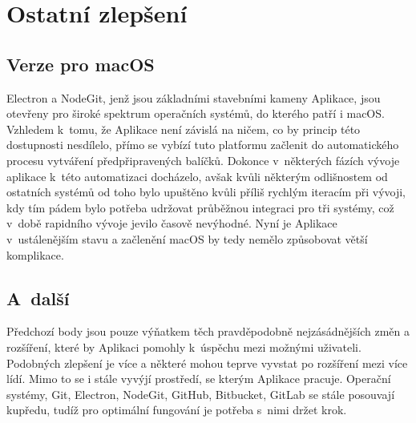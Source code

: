 \section{Ostatní zlepšení}

\subsection{Verze pro macOS}

Electron a NodeGit, jenž jsou základními stavebními kameny Aplikace, jsou otevřeny pro široké spektrum operačních systémů, do kterého patří i macOS. Vzhledem k~tomu, že Aplikace není závislá na ničem, co by princip této dostupnosti nesdílelo, přímo se vybízí tuto platformu začlenit do automatického procesu vytváření předpřipravených balíčků. Dokonce v~některých fázích vývoje aplikace k~této automatizaci docházelo, avšak kvůli některým odlišnostem od ostatních systémů od toho bylo upuštěno kvůli příliš rychlým iteracím při vývoji, kdy tím pádem bylo potřeba udržovat průběžnou integraci pro tři systémy, což v~době rapidního vývoje jevilo časově nevýhodné. Nyní je Aplikace v~ustálenějším stavu a začlenění macOS by tedy nemělo způsobovat větší komplikace.

\subsection{A~další}

Předchozí body jsou pouze výňatkem těch pravděpodobně nejzásádnějších změn a rozšíření, které by Aplikaci pomohly k~úspěchu mezi možnými uživateli. Podobných zlepšení je více a některé mohou teprve vyvstat po rozšíření mezi více lídí. Mimo to se i stále vyvýjí prostředí, se kterým Aplikace pracuje. Operační systémy, Git, Electron, NodeGit, GitHub, Bitbucket, GitLab se stále posouvají kupředu, tudíž pro optimální fungování je potřeba s~nimi držet krok.
